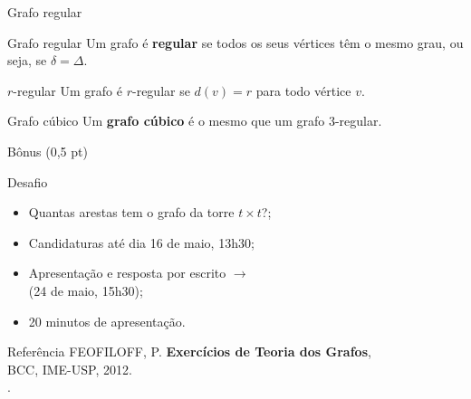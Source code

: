 \documentclass[xcolor=dvipsnames,table]{beamer}
\begin{document}
	\begin{frame}{Grafo regular}
		\begin{block}{Grafo regular}
			Um grafo é {\bf regular} se todos os seus vértices têm o mesmo grau, ou seja, se $\delta = \Delta$.
		\end{block} \pause
		\begin{block}{$r$-regular}
			Um grafo é $r$-regular se $d(v) = r$ para todo vértice $v$.
		\end{block} \pause
		\begin{block}{Grafo cúbico}
			Um {\bf grafo cúbico} é o mesmo que um grafo 3-regular.
		\end{block}
	\end{frame}
    
    \begin{frame}{Bônus (0,5 pt)}
		\begin{block}{Desafio}
			\begin{itemize}
				\item Quantas arestas tem o grafo da torre $t \times t$?; \pause
                \item Candidaturas até dia 16 de maio, 13h30; \pause
                \item Apresentação e resposta por escrito $\rightarrow$ \\(24 de maio, 15h30); \pause
                \item 20 minutos de apresentação.
			\end{itemize}
		\end{block} \pause
        \begin{block}{Referência}
			FEOFILOFF, P. {\bf Exercícios de Teoria dos Grafos}, \\
			BCC, IME-USP, 2012. \\ 
			.
		\end{block}	
	\end{frame}
	
	\begin{frame}
		\titlepage
	\end{frame}
	
\end{document}
